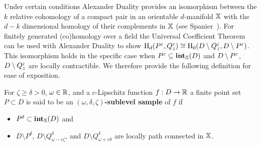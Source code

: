 Under certain conditions Alexander Duality provides an isomorphism between the $k$ relative cohomology of a compact pair in an orientable $d$-manifold $\mathbb{X}$ with the $d - k$ dimensional homology of their complements in $\mathbb{X}$ (see Spanier~\cite{spanier1989algebraic}).
For finitely generated (co)homology over a field the Universal Coefficient Theorem can be used with Alexander Duality to show $\mathrm{H}_d(P^\varepsilon,Q_z^\varepsilon)\cong\mathrm{H}_0(D\setminus Q_z^\varepsilon, D\setminus P^\varepsilon)$.
This isomorphism holds in the specific case when $P^\varepsilon\subseteq \mathbf{int}_{\mathbb{X}}(D)$ and $D\setminus P^\varepsilon$, $D\setminus Q_z^\varepsilon$ are locally contractible.
We therefore provide the following definition for ease of exposition.
\begin{definition}
  For $\zeta\geq \delta > 0$, $\omega\in\mathbb{R}$, and a $c$-Lipschitz function $f: D\to \mathbb{R}$ a finite point set $P\subset D$ is said to be an \textbf{$(\omega, \delta, \zeta)$-sublevel sample} of $f$ if \begin{itemize}
    \item $P^\delta\subset\mathbf{int}_{\mathbb{X}}(D)$ and
    \item $D\setminus P^\delta$, $D\setminus Q_{\omega-c\zeta}^\delta$, and $D\setminus Q_{\omega+c\delta}^\delta$ are locally path connected in $\mathbb{X}$.
  \end{itemize}
\end{definition}

